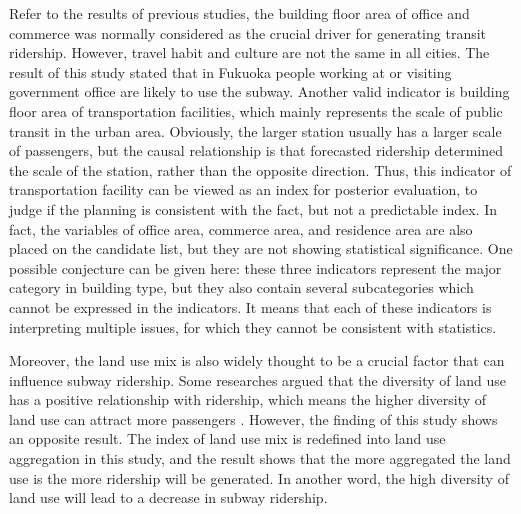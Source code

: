%
Refer to the results of previous studies, the building floor area of office and commerce was normally considered as the crucial driver for generating transit ridership. However, travel habit and culture are not the same in all cities. The result of this study stated that in Fukuoka people working at or visiting government office are likely to use the subway. Another valid indicator is building floor area of transportation facilities, which mainly represents the scale of public transit in the urban area. Obviously, the larger station usually has a larger scale of passengers, but the causal relationship is that forecasted ridership determined the scale of the station, rather than the opposite direction. Thus, this indicator of transportation facility can be viewed as an index for posterior evaluation, to judge if the planning is consistent with the fact, but not a predictable index. In fact, the variables of office area, commerce area, and residence area are also placed on the candidate list, but they are not showing statistical significance. One possible conjecture can be given here: these three indicators represent the major category in building type, but they also contain several subcategories which cannot be expressed in the indicators. It means that each of these indicators is interpreting multiple issues, for which they cannot be consistent with statistics.

%
Moreover, the land use mix is also widely thought to be a crucial factor that can influence subway ridership. Some researches argued that the diversity of land use has a positive relationship with ridership, which means the higher diversity of land use can attract more passengers \cite{gutierrez2011transit,jun2015land}. However, the finding of this study shows an opposite result. The index of land use mix is redefined into land use aggregation in this study, and the result shows that the more aggregated the land use is the more ridership will be generated. In another word, the high diversity of land use will lead to a decrease in subway ridership. 

